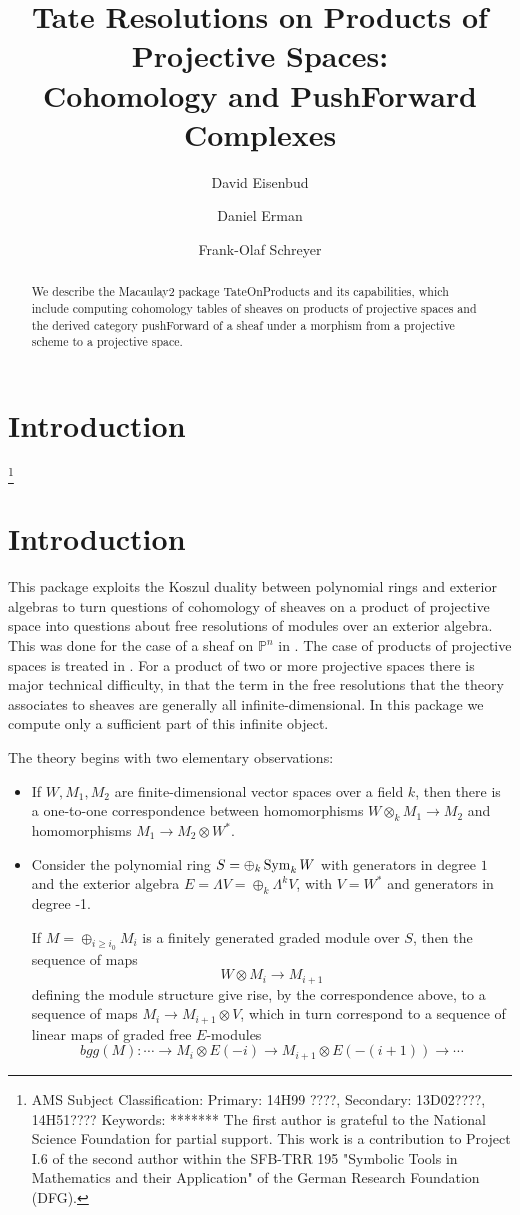 \documentclass[twoside,12pt, leqno]{amsart}
\author[David Eisenbud]{David Eisenbud}
\author{Daniel Erman}
\author[Frank-Olaf Schreyer]{Frank-Olaf Schreyer}
\title{Tate Resolutions on Products of Projective Spaces: \\ Cohomology and PushForward Complexes}
\def\PP{{\mathbb P}}
\begin{document}
\begin{abstract}
We describe the  Macaulay2 package TateOnProducts and its capabilities, which include computing cohomology tables of sheaves
on products of projective spaces and the derived category pushForward of a sheaf under a morphism from a projective scheme to
a projective space.
\end{abstract}

\maketitle

\section*{Introduction} 
\let\thefootnote\relax\footnote{
\noindent AMS Subject Classification:
Primary: 14H99 ????,
Secondary: 13D02????, 14H51???? \smallbreak
Keywords: *******\smallbreak
The first author is grateful to the
National Science Foundation for partial support. This work is a contribution to Project I.6 of the second author within the SFB-TRR 195 "Symbolic Tools in Mathematics and their Application" of the German Research Foundation (DFG).}


\section*{Introduction}

This package exploits the Koszul duality between polynomial rings and exterior algebras to turn questions of cohomology of sheaves on a product of projective space into questions about free resolutions of modules over an exterior algebra. This was done for the case of a sheaf on $\PP^n$ in
\cite{EFS}. The case of products of projective spaces is treated in \cite{EES}. For a product of two or more projective
spaces there is major technical difficulty, in that the term in the free resolutions that the theory
associates to sheaves are generally all infinite-dimensional. In this package we compute only a sufficient
part of this infinite object.

The theory begins with two elementary observations:
\begin{itemize}
 \item If $W,M_1, M_2$ are finite-dimensional vector spaces over a field $k$, then there is a one-to-one correspondence between homomorphisms $W\otimes_kM_1\to M_2$ and homomorphisms
$ M_1 \to M_2 \otimes W^*$.
\item Consider the polynomial ring $S = \oplus_k \operatorname{Sym}_kW$ with generators in degree $1$ and the exterior algebra $E = \Lambda V= \oplus_k \Lambda^kV$, with $V=W^*$ and generators in degree -1.

If $M = \oplus_{i\geq i_0} M_i$ is a finitely generated graded module over $S$, then the sequence of maps 
$$
W\otimes M_i \to M_{i+1}
$$
 defining the module structure give rise, by the correspondence above,
to a sequence of maps $M_i\to M_{i+1}\otimes V$, which in turn correspond to a sequence of
linear maps of graded free $E$-modules 
$$ 
bgg(M): \cdots \to M_i\otimes E(-i) \to M_{i+1}\otimes E(-(i+1))\to \cdots
$$
\end{itemize}
\end{document}
